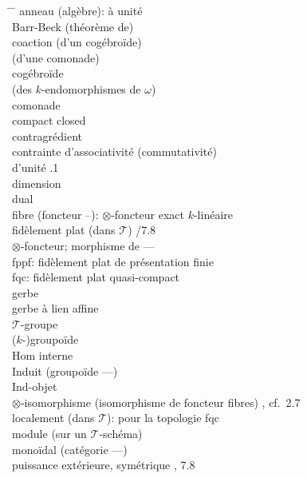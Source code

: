 \documentclass[12pt,a4paper]{article}
\theoremstyle{plain}
\theoremstyle{definition}
\begin{document}
\begin{tabbing}
\hspace{3cm} \= \hspace{3cm} \= \kill
anneau (algèbre): à unité \>  \\[4pt]
Barr-Beck (théorème de) \>  \\[4pt]
coaction (d'un cogébroïde) \>  \\
\> (d'une comonade)  \\[4pt]
cogébroïde \>  \\
\> (des $k$-endomorphismes de $\omega$)  \\[4pt]
comonade \>  \\[4pt]
compact closed \>  \\[4pt]
contragrédient \>  \\[4pt]
contrainte d'associativité (commutativité) \>  \\[4pt]
\> d'unité .1 \\[4pt]
dimension \>  \\[4pt]
dual \>  \\[4pt]
fibre (foncteur --): $\otimes$-foncteur exact $k$-linéaire \>  \\
\> fidèlement plat (dans $\mathcal{T}$) /7.8 \\[4pt]
$\otimes$-foncteur; morphisme de --- \>  \\[4pt]
fppf: fidèlement plat de présentation finie \> \> \\
fqc: fidèlement plat quasi-compact \> \> \\[4pt]
gerbe \>  \\
gerbe à lien affine \>  \\
$\mathcal{T}$-groupe \>  \\
($k$-)groupoïde \>  \\[4pt]
Hom interne \>  \\[4pt]
Induit (groupoïde ---) \>  \\
Ind-objet \>  \\[4pt]
$\otimes$-isomorphisme (isomorphisme de foncteur fibres) \> , cf.~2.7 \\
localement (dans $\mathcal{T}$): pour la topologie fqc \>  \\
module (sur un $\mathcal{T}$-schéma) \>  \\
monoïdal (catégorie ---) \>  \\[4pt]
puissance extérieure, symétrique \> , 7.8 \\

\end{tabbing}
\end{document}
